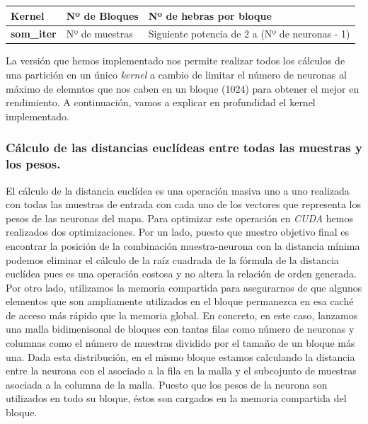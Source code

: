 \begin{table}[ht]
\begin{tabular}{@{}lll@{}}
\toprule
\textbf{Kernel}        & \textbf{Nº de Bloques}                                 & \textbf{Nº de hebras por bloque}                                                                       \\ \midrule
\textbf{som\_iter} &   Nº de muestras & Siguiente potencia de 2 a (Nº de neuronas - 1) \\ \bottomrule
\end{tabular}
\end{table}

La versión que hemos implementado nos permite realizar todos los cálculos de una partición en un único \textit{kernel} a cambio de limitar el número de neuronas al máximo de elemntos que nos caben en un bloque (1024) para obtener el mejor en rendimiento. A continuación, vamos a explicar en profundidad el kernel implementado.

\subsubsection{Cálculo de las distancias euclídeas entre todas las muestras y los pesos.}
El cálculo de la distancia euclídea es una operación masiva uno a uno realizada con todas las muestras de entrada con cada uno de los vectores que representa los pesos de las neuronas del mapa. Para optimizar este operación en \textit{CUDA} hemos realizados dos optimizaciones. Por un lado, puesto que nuestro objetivo final es encontrar la posición de la combinación muestra-neurona con la distancia mínima podemos eliminar el cálculo de la raíz cuadrada de la fórmula de la distancia euclídea pues es una operación costosa y no altera la relación de orden generada. Por otro lado, utilizamos la memoria compartida para asegurarnos de que algunos elementos que son ampliamente utilizados en el bloque permanezca en esa caché de acceso más rápido que la memoria global. En concreto, en este caso, lanzamos una malla bidimenisonal de bloques con tantas filas como número de neuronas y columnas como el número de muestras dividido por el tamaño de un bloque más una. Dada esta distribución, en el mismo bloque estamos calculando la distancia entre la neurona con el asociado a la fila en la malla y el subcojunto de muestras asociada a la columna de la malla. Puesto que los pesos de la neurona son utilizados en todo su bloque, éstos son cargados en la memoria compartida del bloque.


